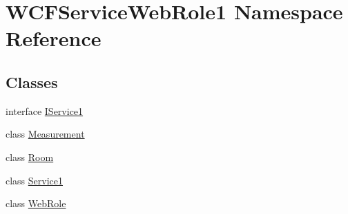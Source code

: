 \hypertarget{namespace_w_c_f_service_web_role1}{}\section{W\+C\+F\+Service\+Web\+Role1 Namespace Reference}
\label{namespace_w_c_f_service_web_role1}
\subsection*{Classes}
\begin{DoxyCompactItemize}
\item 
interface \hyperlink{interface_w_c_f_service_web_role1_1_1_i_service1}{I\+Service1}
\item 
class \hyperlink{class_w_c_f_service_web_role1_1_1_measurement}{Measurement}
\item 
class \hyperlink{class_w_c_f_service_web_role1_1_1_room}{Room}
\item 
class \hyperlink{class_w_c_f_service_web_role1_1_1_service1}{Service1}
\item 
class \hyperlink{class_w_c_f_service_web_role1_1_1_web_role}{Web\+Role}
\end{DoxyCompactItemize}
